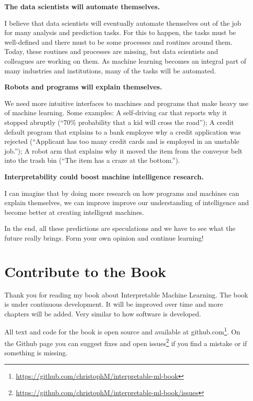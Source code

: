 \documentclass[12pt,]{krantz}
\renewcommand{\href}[2]{#2\footnote{\url{#1}}}
\begin{document}
\textbf{The data scientists will automate themselves.}

I believe that data scientists will eventually automate themselves out
of the job for many analysis and prediction tasks. For this to happen,
the tasks must be well-defined and there must to be some processes and
routines around them. Today, these routines and processes are missing,
but data scientists and colleagues are working on them. As machine
learning becomes an integral part of many industries and institutions,
many of the tasks will be automated.

\textbf{Robots and programs will explain themselves.}

We need more intuitive interfaces to machines and programs that make
heavy use of machine learning. Some examples: A self-driving car that
reports why it stopped abruptly (``70\% probability that a kid will
cross the road''); A credit default program that explains to a bank
employee why a credit application was rejected (``Applicant has too many
credit cards and is employed in an unstable job.''); A robot arm that
explains why it moved the item from the conveyor belt into the trash bin
(``The item has a craze at the bottom.'').

\textbf{Interpretability could boost machine intelligence research.}

I can imagine that by doing more research on how programs and machines
can explain themselves, we can improve improve our understanding of
intelligence and become better at creating intelligent machines.

In the end, all these predictions are speculations and we have to see
what the future really brings. Form your own opinion and continue
learning!

\chapter{Contribute to the Book}\label{contribute}

Thank you for reading my book about Interpretable Machine Learning. The
book is under continuous development. It will be improved over time and
more chapters will be added. Very similar to how software is developed.

All text and code for the book is open source and
\href{https://github.com/christophM/interpretable-ml-book}{available at
github.com}. On the Github page you can suggest fixes and
\href{https://github.com/christophM/interpretable-ml-book/issues}{open
issues} if you find a mistake or if something is missing.
\end{document}
